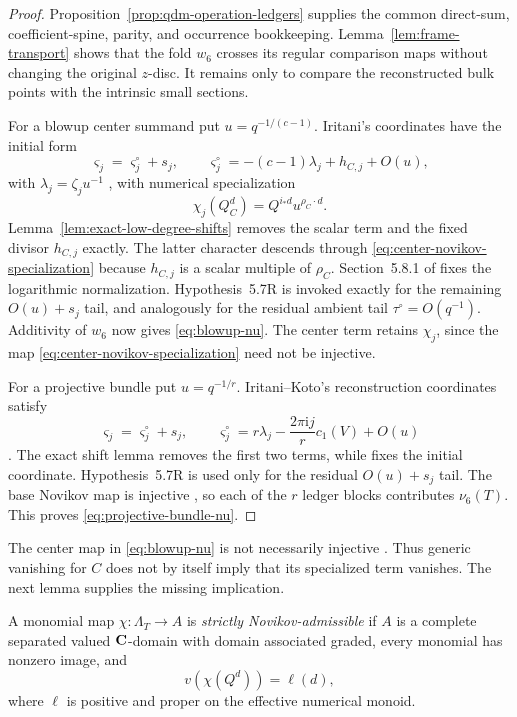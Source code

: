 \begin{proof}
Proposition~\ref{prop:qdm-operation-ledgers} supplies the common direct-sum,
coefficient-spine, parity, and occurrence bookkeeping.
Lemma~\ref{lem:frame-transport} shows that the fold \(w_6\) crosses its regular
comparison maps without changing the original \(z\)-disc.  It remains only to
compare the reconstructed bulk points with the intrinsic small sections.

For a blowup center summand put \(u=q^{-1/(c-1)}\).  Iritani's coordinates
have the initial form
\[
 \varsigma_j=\varsigma_j^\circ+s_j,
 \qquad
 \varsigma_j^\circ=-(c-1)\lambda_j+h_{C,j}+O(u),
 \label{eq:blowup-reconstruction-coordinate}
\]
with $\lambda_j=\zeta_j u^{-1}$
\cite[Section~5.8.2 and (5.27)--(5.30)]{IritaniBlowup}, with numerical
specialization
\[
 \chi_j(Q_C^d)=Q^{i_*d}u^{\rho_C\cdot d}.
 \label{eq:center-novikov-specialization}
\]
Lemma~\ref{lem:exact-low-degree-shifts} removes the scalar term and the fixed
divisor \(h_{C,j}\) exactly.  The latter character descends through
\eqref{eq:center-novikov-specialization} because $h_{C,j}$ is a scalar
multiple of $\rho_C$.  Section~5.8.1 of \cite{IritaniBlowup} fixes the
logarithmic normalization.  Hypothesis~5.7R is invoked exactly for the
remaining \(O(u)+s_j\) tail, and analogously for the residual ambient tail
\(\tau^\circ=O(q^{-1})\).  Additivity of \(w_6\) now gives
\eqref{eq:blowup-nu}.  The center term retains \(\chi_j\), since the map
\eqref{eq:center-novikov-specialization} need not be injective.

For a projective bundle put \(u=q^{-1/r}\).  Iritani--Koto's reconstruction
coordinates satisfy
\[
 \varsigma_j=\varsigma_j^\circ+s_j,
 \qquad
 \varsigma_j^\circ
 =r\lambda_j-\frac{2\pi\mathrm{i}j}{r}c_1(V)+O(u)
\]
\cite[Theorem~5.1(4), Proposition~5.6]{IritaniKoto}.  The exact shift lemma
removes the first two terms, while \cite[(5.11)--(5.12)]{IritaniKoto} fixes
the initial coordinate.  Hypothesis~5.7R is used only for the residual
\(O(u)+s_j\) tail.  The base Novikov map is injective
\cite[(1.1) and Remark~5.2]{IritaniKoto}, so each of the \(r\) ledger blocks
contributes \(\nu_6(T)\).  This proves \eqref{eq:projective-bundle-nu}.
\end{proof}

The center map in \eqref{eq:blowup-nu} is not necessarily injective
\cite[(5.15)]{IritaniBlowup}.  Thus generic vanishing for \(C\) does not by
itself imply that its specialized term vanishes.  The next lemma supplies the
missing implication.

\begin{definition}
\label{def:strict-novikov-admissible}
%
%
A monomial map \(\chi:\Lambda_T\to A\) is \emph{strictly
Novikov-admissible} if \(A\) is a complete separated valued \(\mathbf C\)-domain
with domain associated graded, every monomial has nonzero image, and
\[
 v(\chi(Q^d))=\ell(d),
 \label{eq:strict-novikov-valuation}
\]
where \(\ell\) is positive and proper on the effective numerical monoid.
\end{definition}

